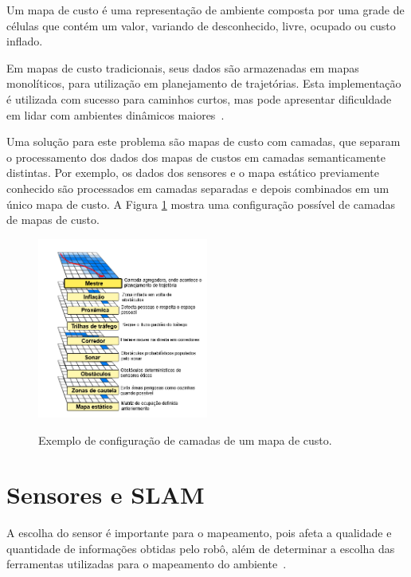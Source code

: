 \documentclass[repeatfields,xlists,xpacks,oneside,yearsonly]{ufrgscca}
\begin{document}
Um mapa de custo é uma representação de ambiente composta por uma
grade de células que contém um valor, variando de desconhecido,
livre, ocupado ou custo inflado.

Em mapas de custo tradicionais, seus dados são armazenadas em mapas
monolíticos, para utilização em planejamento de trajetórias. Esta
implementação é utilizada com sucesso para caminhos curtos, mas pode
apresentar dificuldade em lidar com ambientes dinâmicos
maiores~\cite{layered_costmaps}.

Uma solução para este problema são mapas de custo com camadas, que
separam o processamento dos dados dos mapas de custos em camadas
semanticamente distintas. Por exemplo, os dados dos sensores e o mapa
estático previamente conhecido são processados em camadas separadas e
depois combinados em um único mapa de custo. A Figura
\ref{fig:mapa_camadas} mostra uma configuração possível de camadas de
mapas de custo. 

\begin{figure}[h]
    {
        \centering
        \caption{Exemplo de configuração de camadas de um mapa de custo.}
        \label{fig:mapa_camadas}
        \includegraphics[width=0.5\textwidth]{mapa_camadas_trad.png}\\
    }
    {}
\end{figure}

\section{Sensores e SLAM}


A escolha do sensor é importante para o mapeamento, pois afeta a
qualidade e quantidade de informações obtidas pelo robô, além de
determinar a escolha das ferramentas utilizadas para o mapeamento do
ambiente~\cite{SensorAndSLAM}.
\end{document}
